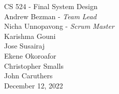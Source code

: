 \documentclass[12pt]{article}
\begin{document}
\begin{titlepage}
\vspace*{\fill}
    \begin{center}
      \huge{CS 524 - Final System Design }\\
      \vspace{40pt}
      \Large{
      Andrew Bezman - \emph{Team Lead}\\
      Nicha Unnopavong - \emph{Scrum Master}\\
      Karishma Gouni\\
      Jose Susairaj\\
      Ekene Okoroafor\\
      Christopher Smalls\\
      John Caruthers\\
      \vspace{40pt}
      December 12, 2022}
    \end{center}
    \vspace*{\fill}
\end{titlepage}
\end{document}
